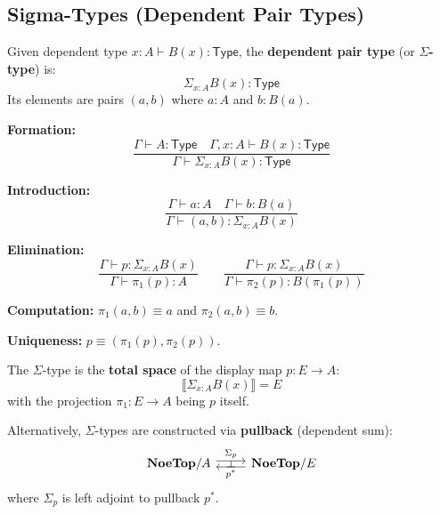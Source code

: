 \subsection{Sigma-Types (Dependent Pair Types)}
\label{subsec:sigma-types}

\begin{definition}
\label{def:sigma-type}
Given dependent type $x : A \vdash B(x) : \mathsf{Type}$, the \textbf{dependent
pair type} (or \textbf{$\Sigma$-type}) is:
\[
  \Sigma_{x : A} B(x) : \mathsf{Type}
\]
Its elements are pairs $(a, b)$ where $a : A$ and $b : B(a)$.
\end{definition}

\begin{definition}
\label{def:sigma-type-rules}
\textbf{Formation:}
\[
  \frac{\Gamma \vdash A : \mathsf{Type} \quad \Gamma, x : A \vdash B(x) : \mathsf{Type}}
       {\Gamma \vdash \Sigma_{x : A} B(x) : \mathsf{Type}}
\]

\textbf{Introduction:}
\[
  \frac{\Gamma \vdash a : A \quad \Gamma \vdash b : B(a)}
       {\Gamma \vdash (a, b) : \Sigma_{x : A} B(x)}
\]

\textbf{Elimination:}
\[
  \frac{\Gamma \vdash p : \Sigma_{x : A} B(x)}
       {\Gamma \vdash \pi_1(p) : A}
  \qquad
  \frac{\Gamma \vdash p : \Sigma_{x : A} B(x)}
       {\Gamma \vdash \pi_2(p) : B(\pi_1(p))}
\]

\textbf{Computation:} $\pi_1(a, b) \equiv a$ and $\pi_2(a, b) \equiv b$.

\textbf{Uniqueness:} $p \equiv (\pi_1(p), \pi_2(p))$.
\end{definition}

\begin{definition}
\label{def:sigma-categorical}
The $\Sigma$-type is the \textbf{total space} of the display map $p : E \to A$:
\[
  \llbracket \Sigma_{x:A} B(x) \rrbracket = E
\]
with the projection $\pi_1 : E \to A$ being $p$ itself.

Alternatively, $\Sigma$-types are constructed via \textbf{pullback} (dependent sum):
\[
\begin{tikzcd}
  \mathbf{NoeTop}/A \arrow[r, shift left, "\Sigma_p"{name=U}]
  & \mathbf{NoeTop}/E \arrow[l, shift left, "p^*"{name=D}]
  \arrow[phantom, from=D, to=U, "\dashv" rotate=-90]
\end{tikzcd}
\]
where $\Sigma_p$ is left adjoint to pullback $p^*$.
\end{definition}

